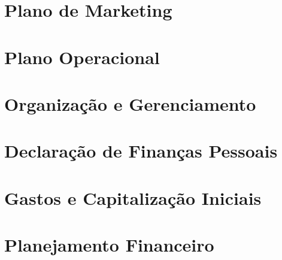 \section{Plano de Marketing}

\section{Plano Operacional}

\section{Organização e Gerenciamento}

\section{Declaração de Finanças Pessoais}

\section{Gastos e Capitalização Iniciais}

\section{Planejamento Financeiro}